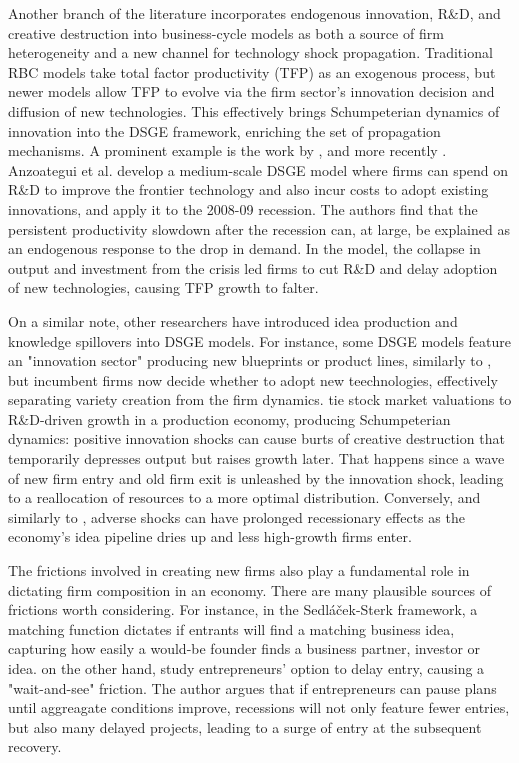 \documentclass[a4paper,12pt]{article} %
\numberwithin{equation}{section} %
\numberwithin{figure}{section}
\numberwithin{table}{section}
\begin{document}
Another branch of the literature incorporates endogenous innovation, R\&D, and creative destruction into business-cycle models as both a source of firm heterogeneity and a 
new channel for technology shock propagation. Traditional RBC models take total factor productivity (TFP) as an exogenous process, but newer models allow TFP to evolve via 
the firm sector's innovation decision and diffusion of new technologies. This effectively brings Schumpeterian dynamics of innovation into the DSGE framework, enriching the 
set of propagation mechanisms.  A prominent example is the work by \textcite{comin2006medium}, and more recently \textcite{anzoategui2019endogenous}. Anzoategui et al. 
develop a medium-scale DSGE model where firms can spend on R\&D to improve the frontier technology and also incur costs to adopt existing innovations, and apply it to the 2008-09 recession. 
The authors find that the persistent productivity slowdown after the recession can, at large, be explained as an endogenous response to the drop in demand. In the model, the collapse in output 
and investment from the crisis led firms to cut R\&D and delay adoption of new technologies, causing TFP growth to falter.

On a similar note, other researchers have introduced idea production and knowledge spillovers into DSGE models. For instance,
some DSGE models feature an "innovation sector" producing new blueprints or product lines, similarly to \textcite{bilbiie2012endogenous},
but incumbent firms now decide whether to adopt new teechnologies, effectively separating variety creation from the firm dynamics.
\textcite{kung2015innovation} tie stock market valuations to R\&D-driven growth in a production economy, producing Schumpeterian dynamics: 
positive innovation shocks can cause burts of creative destruction that temporarily depresses output but raises growth later. That happens 
since a wave of new firm entry and old firm exit is unleashed by the innovation shock, leading to a reallocation of resources to a more 
optimal distribution. Conversely, and similarly to \textcite{sedlavcek2017growth}, adverse shocks can have prolonged recessionary effects
as the economy's idea pipeline dries up and less high-growth firms enter.


The frictions involved in creating new firms also play a fundamental role in dictating firm composition in an economy. There are many plausible 
sources of frictions worth considering. For instance, in the Sedláček-Sterk framework, a matching function dictates if entrants will find a matching
business idea, capturing how easily a would-be founder finds a business partner, investor or idea. \textcite{vardishvili2023entry} on the other hand,
study entrepreneurs' option to delay entry, causing a "wait-and-see" friction. The author argues that if entrepreneurs can pause plans until aggreagate
conditions improve, recessions will not only feature fewer entries, but also many delayed projects, leading to a surge of entry at the subsequent recovery.
\end{document}
